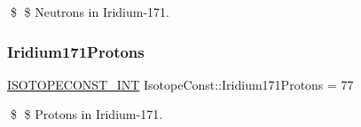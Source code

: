\$ \$ Neutrons in Iridium-\/171. \mbox{\label{group___isotope_const-_iridium-_ir171_ga53ceca111aff99825272393759d71f86}} 
\subsubsection{\texorpdfstring{Iridium171\+Protons}{Iridium171Protons}}
{\footnotesize\ttfamily \mbox{\hyperlink{group___isotope_const-_macros_ga5f18360b3e99483a35c32d789e62621c}{I\+S\+O\+T\+O\+P\+E\+C\+O\+N\+S\+T\+\_\+\+I\+NT}} Isotope\+Const\+::\+Iridium171\+Protons = 77}

\$ \$ Protons in Iridium-\/171. 